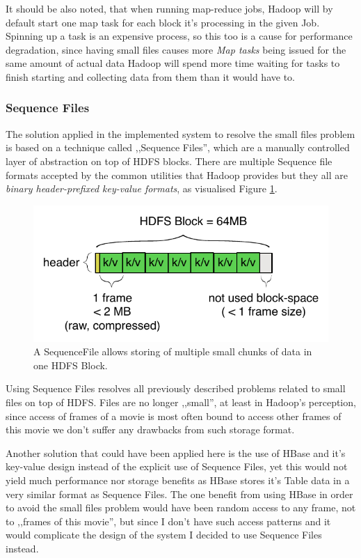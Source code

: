It should be also noted, that when running map-reduce jobs, Hadoop will by default start one map task for each block it's processing in the given Job. Spinning up a task is an expensive process, so this too is a cause for performance degradation, since having small files causes more \textit{Map tasks} being issued for the same amount of actual data Hadoop will spend more time waiting for tasks to finish starting and collecting data from them than it would have to.

\subsubsection{Sequence Files}
\label{sequence-file}
The solution applied in the implemented system to resolve the small files problem is based on a technique called ,,Sequence Files'', which are a manually controlled layer of abstraction on top of HDFS blocks. There are multiple Sequence file formats accepted by the common utilities that Hadoop provides \cite{hadoop-seq-files} but they all are \textit{binary header-prefixed key-value formats}, as visualised Figure \ref{fig:sequence-file}.


\begin{figure}[ch!]
  \centering
  \includegraphics[scale=0.9]{diagrams/sequence-file.pdf}
  \caption{A SequenceFile allows storing of multiple small chunks of data in one HDFS Block.}
  \label{fig:sequence-file}
\end{figure}

Using Sequence Files resolves all previously described problems related to small files on top of HDFS. Files are no longer ,,small'', at least in Hadoop's perception,
since access of frames of a movie is most often bound to access other frames of this movie we don't suffer any drawbacks from such storage format.

Another solution that could have been applied here is the use of HBase and it's key-value design instead of the explicit use of Sequence Files, yet this would not yield much performance nor storage benefits as HBase stores it's Table data in a very similar format as Sequence Files. The one benefit from using HBase in order to avoid the small files problem would have been random access to any frame, not to ,,frames of this movie'', but since I don't have such access patterns and it would complicate the design of the system I decided to use Sequence Files instead.




